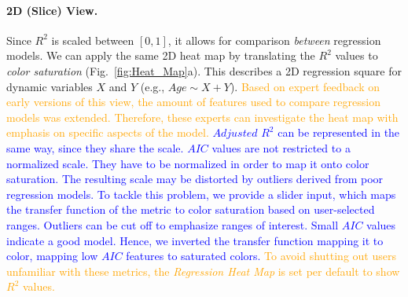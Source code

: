 \documentclass[journal]{style/vgtc} 			          %
\newcommand{\add}[1]{\textcolor{blue}{#1}}
\newcommand{\design}[1]{\textcolor{orange}{#1}}
\begin{document}
\paragraph{2D (Slice) View.}
Since $R^2$ is scaled between $[0, 1]$, it allows for comparison \emph{between} regression models.
We can apply the same 2D heat map by translating the $R^2$ values to \emph{color saturation} (Fig.~\ref{fig:Heat_Map}a).
This describes a 2D regression square for dynamic variables $X$ and $Y$ (e.g., $Age \sim X + Y$).
\design{
Based on expert feedback on early versions of this view, the amount of features used to compare regression models was extended.
Therefore, these experts can investigate the heat map with emphasis on specific aspects of the model.
}
\add{
$Adjusted$ $R^2$ can be represented in the same way, since they share the scale.
$AIC$ values are not restricted to a normalized scale.
They have to be normalized in order to map it onto color saturation.
The resulting scale may be distorted by outliers derived from poor regression models.
To tackle this problem, we provide a slider input, which maps the transfer function of the metric to color saturation based on user-selected ranges.
Outliers can be cut off to emphasize ranges of interest.
Small $AIC$ values indicate a good model.
Hence, we inverted the transfer function mapping it to color, mapping low $AIC$ features to saturated colors.
}
\design{
To avoid shutting out users unfamiliar with these metrics, the \emph{Regression Heat Map} is set per default to show $R^2$ values.
}
\end{document}
